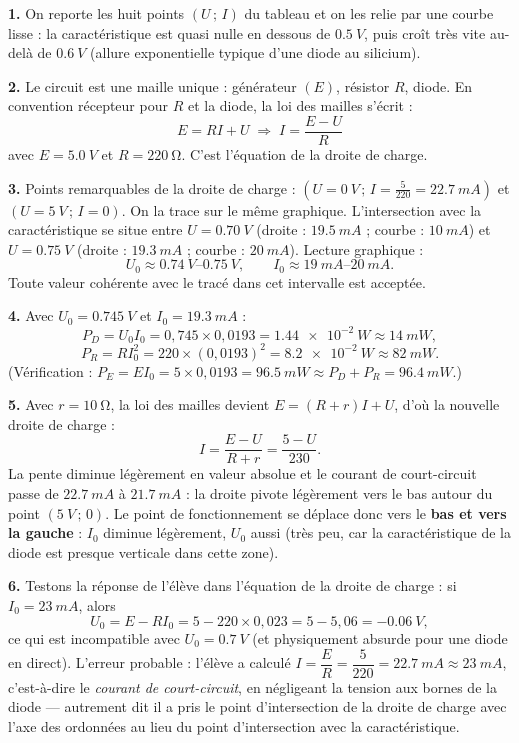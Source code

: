 \documentclass[11pt]{article}
\begin{document}
\begin{corrige}
\textbf{1.} On reporte les huit points $(U\,;\,I)$ du tableau et on les relie par une courbe lisse : la caractéristique est quasi nulle en dessous de $\SI{0,5}{V}$, puis croît très vite au-delà de $\SI{0,6}{V}$ (allure exponentielle typique d'une diode au silicium).

\textbf{2.} Le circuit est une maille unique : générateur $(E)$, résistor $R$, diode. En convention récepteur pour $R$ et la diode, la loi des mailles s'écrit :
\[ E = RI + U \;\Longrightarrow\; \boxed{I = \frac{E - U}{R}} \]
avec $E = \SI{5,0}{V}$ et $R = \SI{220}{\ohm}$. C'est l'équation de la droite de charge.

\textbf{3.} Points remarquables de la droite de charge : $(U = \SI{0}{V}\,;\, I = \frac{5}{220} = \SI{22,7}{mA})$ et $(U = \SI{5}{V}\,;\, I = 0)$. On la trace sur le même graphique. L'intersection avec la caractéristique se situe entre $U = \SI{0,70}{V}$ (droite : $\SI{19,5}{mA}$ ; courbe : $\SI{10}{mA}$) et $U = \SI{0,75}{V}$ (droite : $\SI{19,3}{mA}$ ; courbe : $\SI{20}{mA}$). Lecture graphique :
\[ U_0 \approx \SI{0,74}{V}\text{--}\SI{0,75}{V}, \qquad I_0 \approx \SI{19}{mA}\text{--}\SI{20}{mA}. \]
Toute valeur cohérente avec le tracé dans cet intervalle est acceptée.

\textbf{4.} Avec $U_0 = \SI{0,745}{V}$ et $I_0 = \SI{19,3}{mA}$ :
\[ P_D = U_0 I_0 = 0,745 \times 0,0193 = \SI{1,44e-2}{W} \approx \SI{14}{mW}, \]
\[ P_R = RI_0^2 = 220 \times (0,0193)^2 = \SI{8,2e-2}{W} \approx \SI{82}{mW}. \]
(Vérification : $P_E = EI_0 = 5 \times 0,0193 = \SI{96,5}{mW} \approx P_D + P_R = \SI{96,4}{mW}$.)

\textbf{5.} Avec $r = \SI{10}{\ohm}$, la loi des mailles devient $E = (R + r)I + U$, d'où la nouvelle droite de charge :
\[ I = \frac{E - U}{R + r} = \frac{5 - U}{230}. \]
La pente diminue légèrement en valeur absolue et le courant de court-circuit passe de $\SI{22,7}{mA}$ à $\SI{21,7}{mA}$ : la droite pivote légèrement vers le bas autour du point $(\SI{5}{V}\,;\,0)$. Le point de fonctionnement se déplace donc vers le \textbf{bas et vers la gauche} : $I_0$ diminue légèrement, $U_0$ aussi (très peu, car la caractéristique de la diode est presque verticale dans cette zone).

\textbf{6.} Testons la réponse de l'élève dans l'équation de la droite de charge : si $I_0 = \SI{23}{mA}$, alors
\[ U_0 = E - RI_0 = 5 - 220 \times 0,023 = 5 - 5,06 = -\SI{0,06}{V}, \]
ce qui est incompatible avec $U_0 = \SI{0,7}{V}$ (et physiquement absurde pour une diode en direct). L'erreur probable : l'élève a calculé $I = \dfrac{E}{R} = \dfrac{5}{220} = \SI{22,7}{mA} \approx \SI{23}{mA}$, c'est-à-dire le \emph{courant de court-circuit}, en négligeant la tension aux bornes de la diode — autrement dit il a pris le point d'intersection de la droite de charge avec l'axe des ordonnées au lieu du point d'intersection avec la caractéristique.


\end{corrige}
\end{document}

